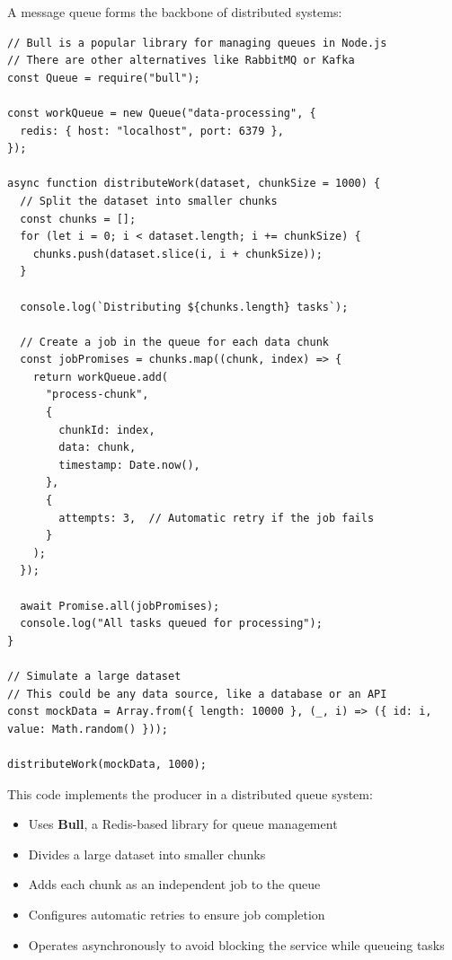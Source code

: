 \documentclass[12pt,letterpaper]{article}
\newenvironment{macterminal}{%
    \begin{mdframed}[
        linecolor=terminalFrame,
        backgroundcolor=terminalBg,
        roundcorner=5pt,
        skipabove=5pt,
        skipbelow=5pt,
        linewidth=1pt,
        innertopmargin=5pt,
        frametitle={%
            \tikz[baseline=(current bounding box.east), outer sep=0pt]{
                \fill[red!80!black] (0,0) circle (5pt);
                \fill[yellow!80!black] (0.7,0) circle (5pt);
                \fill[green!70!black] (1.4,0) circle (5pt);
            }
        },
        frametitlealignment=\raggedright,
        frametitleaboveskip=8pt,
        frametitlebelowskip=0pt,
    ]
}{%
    \end{mdframed}%
}
\begin{document}
A message queue forms the backbone of distributed systems:

\begin{macterminal}
\begin{lstlisting}
// Bull is a popular library for managing queues in Node.js
// There are other alternatives like RabbitMQ or Kafka
const Queue = require("bull");

const workQueue = new Queue("data-processing", {
  redis: { host: "localhost", port: 6379 },
});

async function distributeWork(dataset, chunkSize = 1000) {
  // Split the dataset into smaller chunks
  const chunks = [];
  for (let i = 0; i < dataset.length; i += chunkSize) {
    chunks.push(dataset.slice(i, i + chunkSize));
  }

  console.log(`Distributing ${chunks.length} tasks`);

  // Create a job in the queue for each data chunk
  const jobPromises = chunks.map((chunk, index) => {
    return workQueue.add(
      "process-chunk",
      {
        chunkId: index,
        data: chunk,
        timestamp: Date.now(),
      },
      {
        attempts: 3,  // Automatic retry if the job fails
      }
    );
  });

  await Promise.all(jobPromises);
  console.log("All tasks queued for processing");
}

// Simulate a large dataset
// This could be any data source, like a database or an API
const mockData = Array.from({ length: 10000 }, (_, i) => ({ id: i, value: Math.random() }));

distributeWork(mockData, 1000);
\end{lstlisting}
\end{macterminal}

This code implements the producer in a distributed queue system:
\begin{itemize}
    \item Uses \textbf{\textcolor{accentColor}{Bull}}, a Redis-based library for queue management
    \item Divides a large dataset into smaller chunks
    \item Adds each chunk as an independent job to the queue
    \item Configures automatic retries to ensure job completion
    \item Operates asynchronously to avoid blocking the service while queueing tasks
\end{itemize}
\end{document}
